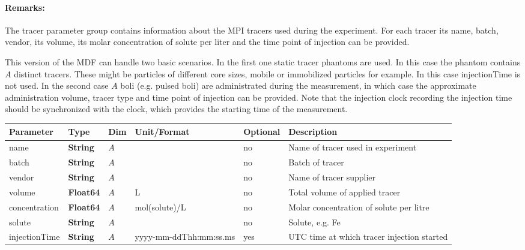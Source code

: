 \documentclass[landscape,a4paper]{article} %
\newcommand{\inltab}[1]{{\ttfamily\bfseries\color{blue}#1}}
\newcommand{\inlvar}[1]{{\ttfamily#1}}
\begin{document}
\begin{multicols}{2}
\paragraph{Remarks:} The tracer parameter group contains information about the MPI tracers used during the experiment. For each tracer its \inlvar{name}, \inlvar{batch}, \inlvar{vendor}, its \inlvar{volume}, its molar \inlvar{concentration} of \inlvar{solute} per liter and the time point of injection can be provided.

This version of the MDF can handle two basic scenarios. In the first one static tracer phantoms are used. In this case the phantom contains $A$ distinct tracers. These might be particles of different core sizes, mobile or immobilized particles for example. In this case \inlvar{injectionTime} is not used. In the second case $A$ boli (e.g. pulsed boli) are administrated during the measurement, in which case the approximate administration volume, tracer type and time point of injection can be provided. Note that the injection clock recording the injection time should be synchronized with the clock, which provides the starting time of the measurement.
\end{multicols}

\noindent \begin{tabularx}{\columnwidth}{lllllX} 
\textbf{Parameter} & \textbf{Type} & \textbf{Dim} & \textbf{Unit/Format} & \textbf{Optional} & \textbf{Description} \\ \hline 
\inlvar{name} & \inltab{String} & $A$ & & no & Name of tracer used in experiment \\ \hline
\inlvar{batch} & \inltab{String} & $A$ & & no & Batch of tracer \\ \hline
\inlvar{vendor} & \inltab{String} & $A$ & & no & Name of tracer supplier \\ \hline
\inlvar{volume} & \inltab{Float64} & $A$ & L & no & Total volume of applied tracer \\ \hline
\inlvar{concentration} & \inltab{Float64} & $A$ & mol(solute)/L & no & Molar concentration of solute per litre \\ \hline
\inlvar{solute} & \inltab{String} & $A$ & & no & Solute, e.g. Fe \\ \hline
\inlvar{injectionTime} & \inltab{String} & $A$ & yyyy-mm-ddThh:mm:ss.ms & yes & UTC time at which tracer injection started \\ \hline
\end{tabularx}
\end{document}
